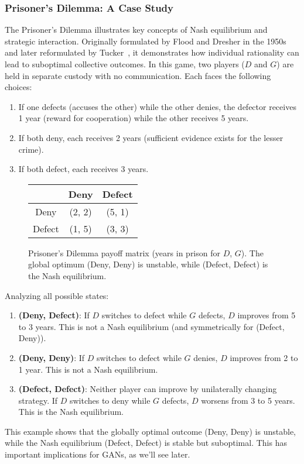 \subsubsection{Prisoner's Dilemma: A Case Study}
\label{sec:prisoners-dilemma}
The Prisoner's Dilemma illustrates key concepts of Nash equilibrium and strategic interaction. Originally formulated by Flood and Dresher in the 1950s and later reformulated by Tucker~\cite{ref:poundstone}, it demonstrates how individual rationality can lead to suboptimal collective outcomes.
In this game, two players ($D$ and $G$) are held in separate custody with no communication. Each faces the following choices:
\begin{enumerate}
	\item If one defects (accuses the other) while the other denies, the defector receives 1 year (reward for cooperation) while the other receives 5 years.
	\item If both deny, each receives 2 years (sufficient evidence exists for the lesser crime).
	\item If both defect, each receives 3 years.
\end{enumerate}
\begin{figure}[h]
	\centering%
	\bgroup%
	\def\arraystretch{1.4}
	\begin{tabular}[c]{|c|c|c|}
		\hline
		\diagbox{$D$}{$G$} & Deny   & Defect \\
		\hline
		Deny               & (2, 2) & (5, 1) \\
		\hline
		Defect             & (1, 5) & (3, 3) \\
		\hline
	\end{tabular}
	\egroup
	\caption{Prisoner's Dilemma payoff matrix (years in prison for $D$, $G$). The global optimum (Deny, Deny) is unstable, while (Defect, Defect) is the Nash equilibrium.}%
	\label{fig:prisoners-matrix}
\end{figure}
Analyzing all possible states:
\begin{enumerate}
	\item \textbf{(Deny, Defect)}: If $D$ switches to defect while $G$ defects, $D$ improves from 5 to 3 years. This is not a Nash equilibrium (and symmetrically for (Defect, Deny)).
	\item \textbf{(Deny, Deny)}: If $D$ switches to defect while $G$ denies, $D$ improves from 2 to 1 year. This is not a Nash equilibrium.
	\item \textbf{(Defect, Defect)}: Neither player can improve by unilaterally changing strategy. If $D$ switches to deny while $G$ defects, $D$ worsens from 3 to 5 years. This is the Nash equilibrium.
\end{enumerate}
This example shows that the globally optimal outcome (Deny, Deny) is unstable, while the Nash equilibrium (Defect, Defect) is stable but suboptimal. This has important implications for GANs, as we'll see later.

